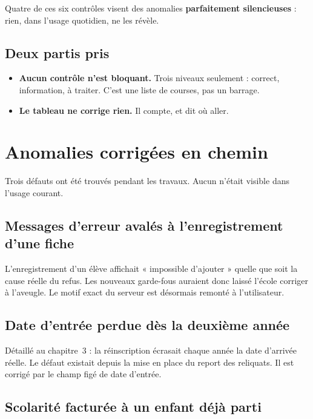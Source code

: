 \documentclass[11pt,a4paper]{report}
\begin{document}
Quatre de ces six contrôles visent des anomalies \textbf{parfaitement
silencieuses} : rien, dans l'usage quotidien, ne les révèle.

\section{Deux partis pris}

\begin{itemize}
\item \textbf{Aucun contrôle n'est bloquant.} Trois niveaux seulement : correct,
      information, à traiter. C'est une liste de courses, pas un barrage.
\item \textbf{Le tableau ne corrige rien.} Il compte, et dit où aller.
\end{itemize}

\chapter{Anomalies corrigées en chemin}

Trois défauts ont été trouvés pendant les travaux. Aucun n'était visible dans
l'usage courant.

\section{Messages d'erreur avalés à l'enregistrement d'une fiche}

L'enregistrement d'un élève affichait « impossible d'ajouter » quelle que soit
la cause réelle du refus. Les nouveaux garde-fous auraient donc laissé l'école
corriger à l'aveugle. Le motif exact du serveur est désormais remonté à
l'utilisateur.

\section{Date d'entrée perdue dès la deuxième année}

Détaillé au chapitre~3 : la réinscription écrasait chaque année la date
d'arrivée réelle. Le défaut existait depuis la mise en place du report des
reliquats. Il est corrigé par le champ figé de date d'entrée.

\section{Scolarité facturée à un enfant déjà parti}
\end{document}
